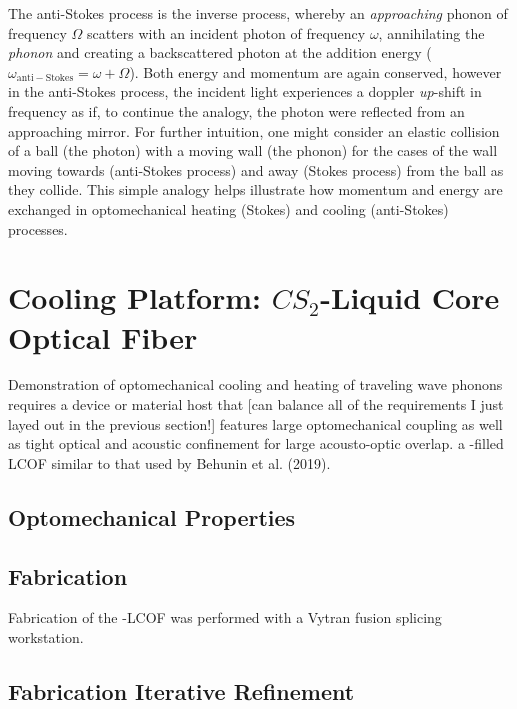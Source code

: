 The anti-Stokes process is the inverse process, whereby an \textit{approaching} phonon of frequency \(\Omega\) scatters with an incident photon of frequency \(\omega\), annihilating the \textit{phonon} and creating a backscattered photon at the addition energy (\(\omega_{\mathrm{anti-Stokes}} = \omega + \Omega\)). Both energy and momentum are again conserved, however in the anti-Stokes process, the incident light experiences a doppler \textit{up}-shift in frequency as if, to continue the analogy, the photon were reflected from an approaching mirror. For further intuition, one might consider an elastic collision of a ball (the photon) with a moving wall (the phonon) for the cases of the wall moving towards (anti-Stokes process) and away (Stokes process) from the ball as they collide. This simple analogy helps illustrate how momentum and energy are exchanged in optomechanical heating (Stokes) and cooling (anti-Stokes) processes.


\section{Cooling Platform: \texorpdfstring{$CS_{2}$}{CS2}-Liquid Core Optical Fiber}
\label{sec:Cooling:Platform}

Demonstration of optomechanical cooling and heating of traveling wave phonons requires a device or material host that [can balance all of the requirements I just layed out in the previous section!] features large optomechanical coupling as well as tight optical and acoustic confinement for large acousto-optic overlap.  a -filled \ac{LCOF} similar to that used by Behunin et al. (2019). \cite{behunin2019spontaneous}

\subsection{Optomechanical Properties}
\label{subsec:Cooling:Platform:Properties}


\subsection{Fabrication}
\label{subsec:Cooling:Platform:Fabrication}

Fabrication of the -\ac{LCOF} was performed with a Vytran fusion splicing workstation.


\subsection{Fabrication Iterative Refinement}
\label{subsec:Cooling:Platform:Refinement}

